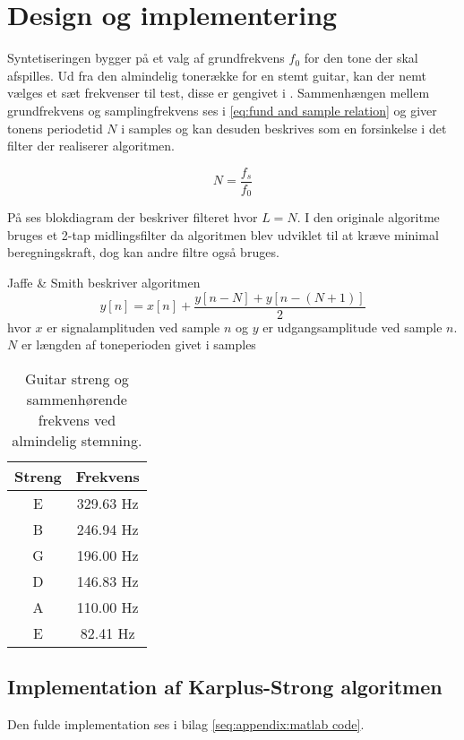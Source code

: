 \section{Design og implementering}

Syntetiseringen bygger på et valg af grundfrekvens \(f_0\) for den tone der skal afspilles.
Ud fra den almindelig tonerække for en stemt guitar\cite{GuitarTunings}, kan der nemt vælges et sæt frekvenser til test, disse er gengivet i .
Sammenhængen mellem grundfrekvens og samplingfrekvens ses i \ref{eq:fund and sample relation} og giver tonens periodetid \(N\) i samples og kan desuden beskrives som en forsinkelse i det filter der realiserer algoritmen.

\begin{equation}\label{eq:fund and sample relation}
  N = \frac{f_s}{f_0}
\end{equation}

På  ses blokdiagram der beskriver filteret hvor \(L = N\). I den originale algoritme bruges et 2-tap midlingsfilter da algoritmen blev udviklet til at kræve minimal beregningskraft\cite{Karplus1983}, dog kan andre filtre også bruges.


Jaffe \& Smith beskriver algoritmen
\begin{equation}
  y[n] = x[n] + \frac{y[n - N] + y\left[n -(N + 1)\right]}{2}
\end{equation}
hvor \(x\) er signalamplituden ved sample \(n\) og \(y\) er udgangsamplitude ved sample \(n\).
\(N\) er længden af toneperioden givet i samples \cite{Jaffe1983}

\begin{table}[]
  \centering
  \caption{Guitar streng og sammenhørende frekvens ved almindelig stemning\cite{GuitarTunings}.}
  \label{tab:guitar tunings}
  \begin{tabular}{cc}
    \toprule
    Streng & Frekvens  \\ \midrule
    E      & 329.63 Hz \\
    B      & 246.94 Hz \\
    G      & 196.00 Hz \\
    D      & 146.83 Hz \\
    A      & 110.00 Hz \\
    E      & 82.41 Hz  \\ \bottomrule
  \end{tabular}
\end{table}

\subsection{Implementation af Karplus-Strong algoritmen}

Den fulde implementation ses i bilag \ref{seq:appendix:matlab code}.

